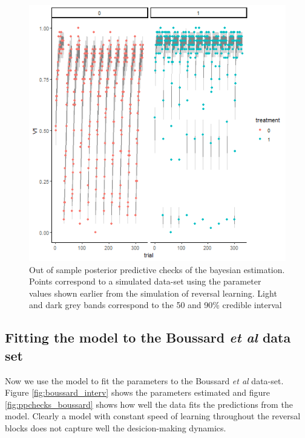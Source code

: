 \documentclass[
]{article}
\begin{document}
\begin{figure}

\includegraphics[width=6.67in,]{images/reversal_ppchecks} \hfill{}

\caption{Out of sample posterior predictive checks of the bayesian estimation. Points correspond to a simulated data-set using the parameter values shown earlier from the simulation of reversal learning. Light and dark grey bands correspond to the 50 and 90\% credible interval}\label{fig:ppcheck_rev}
\end{figure}

\hypertarget{fitting-the-model-to-the-boussard-et-al-data-set}{%
\subsection{\texorpdfstring{Fitting the model to the Boussard \emph{et
al} data
set}{Fitting the model to the Boussard et al data set}}\label{fitting-the-model-to-the-boussard-et-al-data-set}}

Now we use the model to fit the parameters to the Boussard \emph{et al}
data-set. Figure \ref{fig:boussard_interv} shows the parameters
estimated and figure \ref{fig:ppchecks_boussard} shows how well the data
fits the predictions from the model. Clearly a model with constant speed
of learning throughout the reversal blocks does not capture well the
desicion-making dynamics.
\end{document}
